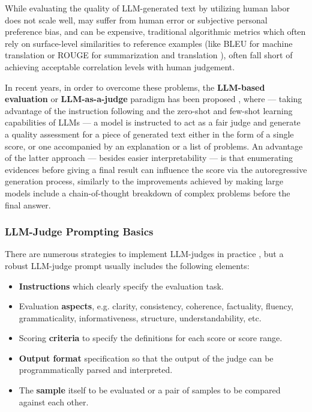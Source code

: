 \documentclass[UTF8,noindent,nohyp,parspace,titlepage,twoside,12pt]{article}
\begin{document}
      While evaluating the quality of LLM-generated text by utilizing human
      labor does not scale well, may suffer from human error or subjective
      personal preference bias, and can be expensive, traditional algorithmic
      metrics which often rely on surface-level similarities to reference
      examples (like BLEU for machine translation \cite{bleu} or ROUGE for
      summarization and translation \cite{rouge}), often fall short of achieving
      acceptable correlation levels with human judgement.

      In recent years, in order to overcome these problems, the
      \textbf{LLM-based evaluation} or \textbf{LLM-as-a-judge} paradigm has
      been proposed \cite{gptscore,chatgptgoodeval,reffree,geval},
      where --- taking advantage of the instruction following and the zero-shot
      and few-shot learning capabilities of LLMs --- a model is instructed to
      act as a fair judge and generate a quality assessment for a piece of
      generated text either in the form of a single score, or one accompanied by
      an explanation or a list of problems. An advantage of the latter approach
      --- besides easier interpretability --- is that enumerating evidences
      before giving a final result can influence the score via the
      autoregressive generation process, similarly to the improvements achieved
      by making large models include a chain-of-thought \cite{cot} breakdown of
      complex problems before the final answer.

      \subsubsection{LLM-Judge Prompting Basics}

        There are numerous strategies to implement LLM-judges in practice
        \cite{judgetaxonomy}, but a robust LLM-judge prompt usually includes
        the following elements:

        \begin{itemize}
          \item \textbf{Instructions} which clearly specify the evaluation task.

          \item Evaluation \textbf{aspects}, e.g. clarity, consistency,
                coherence, factuality, fluency, grammaticality,
                informativeness, structure, understandability, etc.

          \item Scoring \textbf{criteria} to specify the definitions for each
                score or score range.

          \item \textbf{Output format} specification so that the output of the
                judge can be programmatically parsed and interpreted.

          \item The \textbf{sample} itself to be evaluated or a pair of samples
                to be compared against each other.
        \end{itemize}
\end{document}
